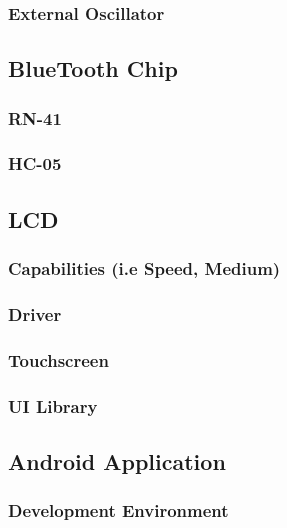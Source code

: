 \subsubsection{External Oscillator}

\subsection{BlueTooth Chip}

\subsubsection{RN-41}

\subsubsection{HC-05}

\subsection{LCD}

\subsubsection{Capabilities (i.e Speed, Medium)}

\subsubsection{Driver}

\subsubsection{Touchscreen}

\subsubsection{UI Library}

\subsection{Android Application}

\subsubsection{Development Environment}

